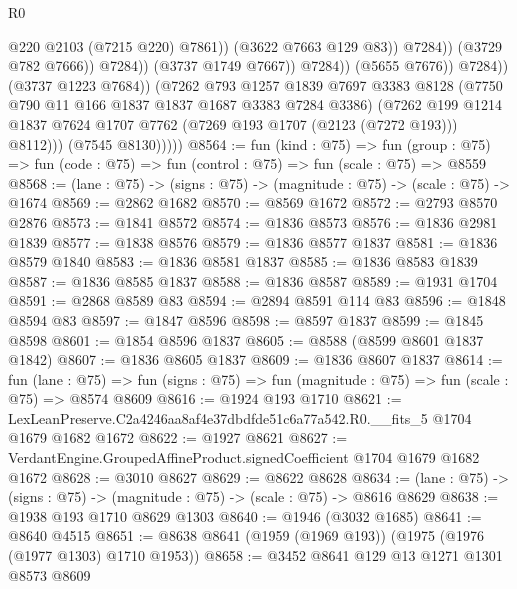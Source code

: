 \begin{lexlean}{R0}
\begin{coremodule}
                                            @220
                                            @2103
                                            (@7215 @220)
                                            @7861))
                                        (@3622 @7663 @129 @83))
                                      @7284))
                                  (@3729 @782 @7666))
                                @7284))
                            (@3737 @1749 @7667))
                          @7284))
                      (@5655 @7676))
                    @7284))
                (@3737 @1223 @7684))
              (@7262
                @793
                @1257
                @1839
                @7697
                @3383
                @8128
                (@7750 @790 @11 @166 @1837 @1837 @1687 @3383 @7284 @3386)
                (@7262
                  @199
                  @1214
                  @1837
                  @7624
                  @1707
                  @7762
                  (@7269 @193 @1707 (@2123 (@7272 @193)))
                  @8112)))
            (@7545 @8130)))))
@8564 := fun (kind : @75) =>
  fun (group : @75) => fun (code : @75) => fun (control : @75) => fun (scale : @75) => @8559
@8568 := (lane : @75) -> (signs : @75) -> (magnitude : @75) -> (scale : @75) -> @1674
@8569 := @2862 @1682
@8570 := @8569 @1672
@8572 := @2793 @8570 @2876
@8573 := @1841 @8572
@8574 := @1836 @8573
@8576 := @1836 @2981 @1839
@8577 := @1838 @8576
@8579 := @1836 @8577 @1837
@8581 := @1836 @8579 @1840
@8583 := @1836 @8581 @1837
@8585 := @1836 @8583 @1839
@8587 := @1836 @8585 @1837
@8588 := @1836 @8587
@8589 := @1931 @1704
@8591 := @2868 @8589 @83
@8594 := @2894 @8591 @114 @83
@8596 := @1848 @8594 @83
@8597 := @1847 @8596
@8598 := @8597 @1837
@8599 := @1845 @8598
@8601 := @1854 @8596 @1837
@8605 := @8588 (@8599 @8601 @1837 @1842)
@8607 := @1836 @8605 @1837
@8609 := @1836 @8607 @1837
@8614 := fun (lane : @75) =>
  fun (signs : @75) => fun (magnitude : @75) => fun (scale : @75) => @8574 @8609
@8616 := @1924 @193 @1710
@8621 := LexLeanPreserve.C2a4246aa8af4e37dbdfde51c6a77a542.R0.__fits_5 @1704 @1679 @1682 @1672
@8622 := @1927 @8621
@8627 := VerdantEngine.GroupedAffineProduct.signedCoefficient @1704 @1679 @1682 @1672
@8628 := @3010 @8627
@8629 := @8622 @8628
@8634 := (lane : @75) -> (signs : @75) -> (magnitude : @75) -> (scale : @75) -> @8616 @8629
@8638 := @1938 @193 @1710 @8629 @1303
@8640 := @1946 (@3032 @1685)
@8641 := @8640 @4515
@8651 := @8638 @8641 (@1959 (@1969 @193)) (@1975 (@1976 (@1977 @1303) @1710 @1953))
@8658 := @3452 @8641 @129 @13 @1271 @1301 @8573 @8609

\end{coremodule}
\end{lexlean}
